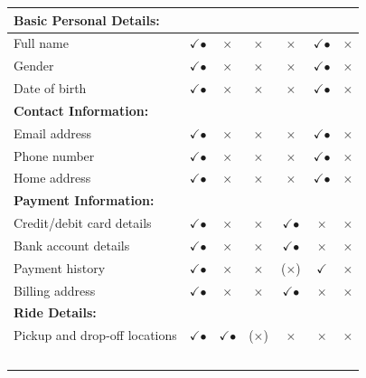 \begin{longtable}{|l|c|c|c|c|c|c|}
\multicolumn{1}{|l|}{\textbf{Basic Personal Details:}} & \multicolumn{1}{c}{} & \multicolumn{1}{c}{} & \multicolumn{1}{c}{} & \multicolumn{1}{c}{} & \multicolumn{1}{c}{} & \multicolumn{1}{c|}{} \\
\hline
Full name & $\checkmark$$\bullet$ &  $\times$ & $\times$ & $\times$ & $\checkmark$$\bullet$ & $\times$ \\
\hline
Gender & $\checkmark$$\bullet$ &  $\times$ & $\times$ & $\times$ & $\checkmark$$\bullet$ & $\times$ \\
\hline
Date of birth & $\checkmark$$\bullet$ &  $\times$ & $\times$ & $\times$ & $\checkmark$$\bullet$ & $\times$ \\
\hline
\multicolumn{1}{|l|}{\textbf{Contact Information:}} & \multicolumn{1}{c}{} & \multicolumn{1}{c}{} & \multicolumn{1}{c}{} & \multicolumn{1}{c}{} & \multicolumn{1}{c}{} & \multicolumn{1}{c|}{} \\
\hline
Email address & $\checkmark$$\bullet$ &  $\times$ & $\times$ & $\times$ & $\checkmark$$\bullet$ & $\times$ \\
\hline
Phone number & $\checkmark$$\bullet$ &  $\times$ & $\times$ & $\times$ & $\checkmark$$\bullet$ & $\times$ \\
\hline
Home address & $\checkmark$$\bullet$ &  $\times$ & $\times$ & $\times$ & $\checkmark$$\bullet$ & $\times$ \\
\hline
\multicolumn{1}{|l|}{\textbf{Payment Information:}} & \multicolumn{1}{c}{} & \multicolumn{1}{c}{} & \multicolumn{1}{c}{} & \multicolumn{1}{c}{} & \multicolumn{1}{c}{} & \multicolumn{1}{c|}{} \\
\hline
Credit/debit card details & $\checkmark$$\bullet$ & $\times$ & $\times$ & $\checkmark$$\bullet$ & $\times$ & $\times$ \\
\hline
Bank account details & $\checkmark$$\bullet$ & $\times$ & $\times$ & $\checkmark$$\bullet$ & $\times$ & $\times$  \\
\hline
Payment history & $\checkmark$$\bullet$ & $\times$ & $\times$ & ($\times$) &$\checkmark$ & $\times$ \\
\hline
Billing address & $\checkmark$$\bullet$ & $\times$ & $\times$ & $\checkmark$$\bullet$ & $\times$ & $\times$ \\
\hline
\multicolumn{1}{|l|}{\textbf{Ride Details:}} & \multicolumn{1}{c}{} & \multicolumn{1}{c}{} & \multicolumn{1}{c}{} & \multicolumn{1}{c}{} & \multicolumn{1}{c}{} & \multicolumn{1}{c|}{} \\
\hline
Pickup and drop-off locations & $\checkmark$$\bullet$ & $\checkmark$$\bullet$ &  ($\times$) & $\times$ & $\times$ & $\times$ \\
$$
\end{longtable}
